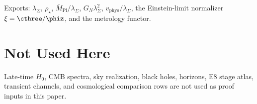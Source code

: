 \begin{tfptexports}
Exports: $\lambda_\Sigma$, $\rho_\star$, $\bar M_{\mathrm{Pl}}/\lambda_\Sigma$, $G_N\lambda_\Sigma^2$, $v_{\mathrm{phys}}/\lambda_\Sigma$, the Einstein-limit normalizer $\xi=\cthree/\phiz$, and the metrology functor.
\end{tfptexports}

\section{Not Used Here}

Late-time $H_0$, CMB spectra, sky realization, black holes, horizons, E8 stage atlas, transient
channels, and cosmological comparison rows are not used as proof inputs in this paper.


